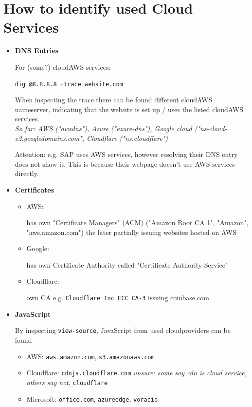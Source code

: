 \documentclass[12pt]{article}
\begin{document}
\newpage
\section*{How to identify used Cloud Services}
\begin{itemize}
    \item \textbf{DNS Entries}
    
    For (some?) cloudAWS services:
    
    \verb|dig @8.8.8.8 +trace website.com|
    
    When inspecting the trace there can be found different cloudAWS nameserver, indicating that the website is set up / uses the listed cloudAWS services. \\
    \textit{So far: AWS ("awsdns"), Azure ("azure-dns"), Google cloud ("ns-cloud-c2.googledomains.com", Cloudflare ("ns.cloudflare")}
    
    Attention: e.g. SAP uses AWS services, however resolving their DNS entry does not show it. This is because their webpage doesn't use AWS services directly.
    
    
    \item \textbf{Certificates}
    \begin{itemize}
        \item AWS: 
    
        has own "Certificate Managers" (ACM) ("Amazon Root CA 1", "Amazon", "aws.amazon.com") the later partially issuing websites hosted on AWS
        
        \item Google: 
    
        has own Certificate Authority called "Certificate Authority Service" 
        
        \item Cloudflare: 
    
        own CA e.g. \verb|Cloudflare Inc ECC CA-3| issuing coinbase.com
    \end{itemize}
    
    \item \textbf{JavaScript}
    
    By inspecting \verb|view-source|, JavaScript from used cloudproviders can be found
    \begin{itemize}
        \item AWS: \verb|aws.amazon.com|, \verb|s3.amazonaws.com|
        \item Cloudflare:
        \verb|cdnjs.cloudflare.com| \textit{unsure: some say cdn is cloud service, others say not}, \verb|cloudflare|
        \item Microsoft: \verb|office.com|, \verb|azureedge|, \verb|voracio|
    \end{itemize}
\end{itemize}
\end{document}
